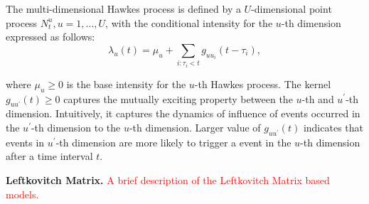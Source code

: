 The multi-dimensional Hawkes process is defined by a $U$-dimensional point process $N_t^u, u =1, . . . , U$, with the conditional intensity for the $u$-th dimension expressed as follows:
$$\lambda_u(t) = \mu_u + \sum_{i:\tau_i<t} g_{uu_i}(t-\tau_i),$$

where $\mu_u \ge 0$ is the base intensity for the $u$-th Hawkes process. The kernel $g_{uu^\prime}(t) \ge 0$ captures the mutually exciting property between the $u$-th and $u^\prime$-th dimension. Intuitively, it captures the dynamics of influence of events occurred in the $u^\prime$-th dimension to the $u$-th dimension. Larger value of $g_{uu^\prime}(t)$  indicates that events in $u^\prime$-th dimension are more likely to trigger a event in the $u$-th dimension after a time interval $t$.

\textbf{Leftkovitch Matrix.} \textcolor{red}{A brief description of the Leftkovitch Matrix based models.}

